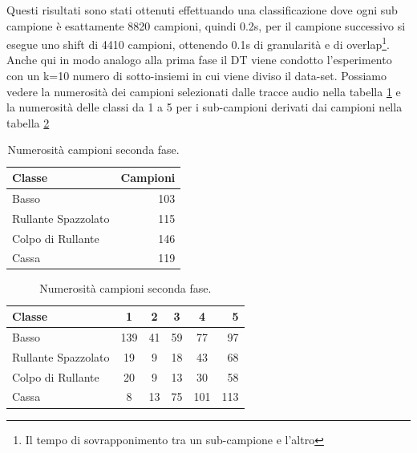 Questi risultati sono stati ottenuti effettuando una classificazione dove ogni sub campione è esattamente 8820 campioni, quindi 0.2s, per il campione successivo si esegue uno shift di 4410 campioni, ottenendo 0.1s di granularità e di overlap\footnote{Il tempo di sovrapponimento tra un sub-campione e l'altro}. Anche qui in modo analogo alla prima fase il DT viene condotto l'esperimento con un k=10 numero di sotto-insiemi in cui viene diviso il data-set. Possiamo vedere la numerosità dei campioni selezionati dalle tracce audio nella tabella \ref{tab:numerosità_2.1} e la numerosità delle classi da 1 a 5 per i sub-campioni derivati dai campioni nella tabella \ref{tab:numerosità_2.2}\\

\begin{table}[h!]
	\begin{center}
		\begin{tabular}{l|r} %
			\textbf{Classe} & \textbf{Campioni}\\
			\hline
			Basso & 103\\
			Rullante Spazzolato & 115\\
			Colpo di Rullante & 146\\
			Cassa & 119
		\end{tabular}
		\caption{Numerosità campioni seconda fase.}
		\label{tab:numerosità_2.1}
	\end{center}
\end{table}

\begin{table}[h!]
	\begin{center}
		\begin{tabular}{l|c|c|c|c|r} %
			\textbf{Classe} & \textbf{1} & \textbf{2} & \textbf{3} & \textbf{4} & \textbf{5}\\
			\hline
			Basso & 139 & 41 & 59 & 77 & 97\\
			Rullante Spazzolato & 19 & 9 & 18 & 43 & 68\\
			Colpo di Rullante & 20 & 9 & 13 & 30 & 58\\
			Cassa & 8 & 13 & 75 & 101 & 113
		\end{tabular}
		\caption{Numerosità campioni seconda fase.}
		\label{tab:numerosità_2.2}
	\end{center}
\end{table}

